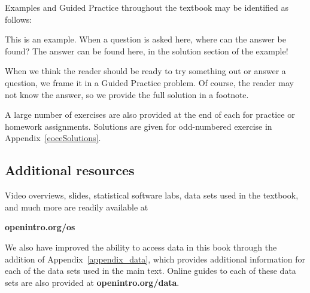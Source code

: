 \noindent%
Examples and Guided Practice throughout the textbook may be
identified as follows:

\begin{examplewrap}
\begin{nexample}{This is an example.
    When a question is asked here, where can the answer be found?}
  The answer can be found here, in the solution section
  of the example!
\end{nexample}
\end{examplewrap}

\begin{exercisewrap}
\begin{nexercise}
When we think the reader should be ready to try something out
or answer a question, we frame it in a Guided Practice problem.
Of course, the reader may not know the answer,
so we provide the full solution in a footnote.\footnotemark{}
\end{nexercise}
\end{exercisewrap}

\noindent%
A large number of exercises are also provided at the end
of each  for practice
or homework assignments.
Solutions are given for odd-numbered exercise in
Appendix~\ref{eoceSolutions}.


\subsection*{Additional resources}

Video overviews, slides, statistical software labs,
data sets used in the textbook,
and much more are readily available at\\[-5mm]
\begin{center}
    {\color{black}\textbf{openintro.org/os}}
\end{center}
We also have improved the ability to access data in this book
through the addition of Appendix~\ref{appendix_data},
which provides additional information for each of the data sets
used in the main text.
Online guides to each of these data sets are also provided at
    {\color{black}\textbf{openintro.org/data}}. \vspace{3mm}

